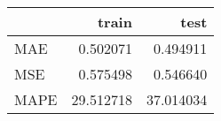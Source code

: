\begin{tabular}{lrr}
\toprule
{} &      train &       test \\
\midrule
MAE  &   0.502071 &   0.494911 \\
MSE  &   0.575498 &   0.546640 \\
MAPE &  29.512718 &  37.014034 \\
\bottomrule
\end{tabular}

